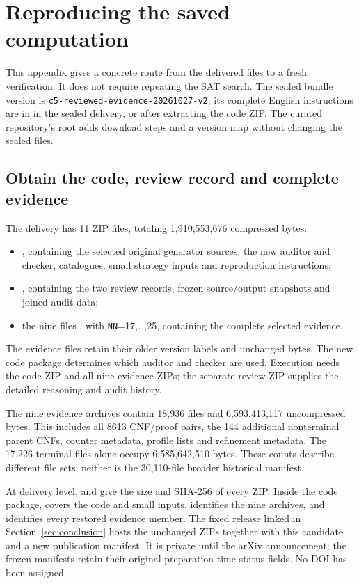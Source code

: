 \section{Reproducing the saved computation}\label{app:reproduction}
This appendix gives a concrete route from the delivered files to a fresh
verification. It does not require repeating the SAT search. The sealed
bundle version is \texttt{c5-reviewed-evidence-20261027-v2}; its complete
English instructions are in  in the sealed
delivery, or  after extracting the code ZIP.
The curated repository's root  adds download steps
and a version map without changing the sealed files.

\subsection{Obtain the code, review record and complete evidence}
The delivery has 11 ZIP files, totaling 1,910,553,676 compressed bytes:
\begin{itemize}
\item {}, containing the
selected original generator sources, the new auditor and checker,
catalogues, small strategy inputs and reproduction instructions;
\item {}, containing the two
review records, frozen source/output snapshots and joined audit data;
\item the nine files , with
\texttt{NN}=17,\ldots,25, containing the complete selected evidence.
\end{itemize}
The evidence files retain their older version labels and unchanged bytes.
The new code package determines which auditor and checker are used.
Execution needs the code ZIP and all nine evidence ZIPs; the separate
review ZIP supplies the detailed reasoning and audit history.

The nine evidence archives contain 18,936 files and 6,593,413,117
uncompressed bytes. This includes all 8613 CNF/proof pairs, the 144
additional nonterminal parent CNFs, counter metadata, profile lists and
refinement metadata. The 17,226 terminal files alone occupy
6,585,642,510 bytes. These counts describe different file sets; neither
is the 30,110-file broader historical manifest.

At delivery level,  and
 give the size and SHA-256 of every ZIP. Inside the
code package,  covers the code and small inputs,
 identifies the nine archives, and
 identifies every restored evidence member.
The fixed release linked in Section~\ref{sec:conclusion} hosts the
unchanged ZIPs together with this candidate and a new publication manifest.
It is private until the arXiv announcement; the frozen manifests retain
their original preparation-time status fields. No DOI has been assigned.

